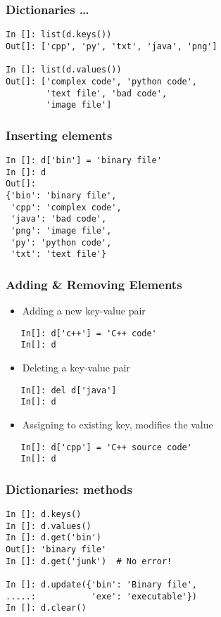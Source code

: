 \documentclass[14pt,compress]{beamer}
\begin{document}
\begin{frame}[fragile]
  \frametitle{Dictionaries \ldots}
  \begin{small}
    \begin{lstlisting}
In []: list(d.keys())
Out[]: ['cpp', 'py', 'txt', 'java', 'png']

In []: list(d.values())
Out[]: ['complex code', 'python code',
        'text file', 'bad code',
        'image file']
    \end{lstlisting}
  \end{small}
\end{frame}

\begin{frame}[fragile]
  \frametitle{Inserting elements}
  \begin{lstlisting}
In []: d['bin'] = 'binary file'
In []: d
Out[]:
{'bin': 'binary file',
 'cpp': 'complex code',
 'java': 'bad code',
 'png': 'image file',
 'py': 'python code',
 'txt': 'text file'}
  \end{lstlisting}
\end{frame}

\begin{frame}[fragile]
  \frametitle{Adding \& Removing Elements}
  \begin{itemize}
  \item Adding a new key-value pair
  \end{itemize}
  \begin{lstlisting}
   In[]: d['c++'] = 'C++ code'
   In[]: d
  \end{lstlisting}
  \begin{itemize}
  \item Deleting a key-value pair
  \end{itemize}
  \begin{lstlisting}
   In[]: del d['java']
   In[]: d
  \end{lstlisting}
  \begin{itemize}
  \item Assigning to existing key, modifies the value
  \end{itemize}
  \begin{lstlisting}
   In[]: d['cpp'] = 'C++ source code'
   In[]: d
  \end{lstlisting}
\end{frame}

\begin{frame}[fragile]
  \frametitle{Dictionaries:  methods}
\begin{lstlisting}
In []: d.keys()
In []: d.values()
In []: d.get('bin')
Out[]: 'binary file'
In []: d.get('junk')  # No error!

In []: d.update({'bin': 'Binary file',
.....:           'exe': 'executable'})
In []: d.clear()
\end{lstlisting}
\end{frame}
\end{document}

